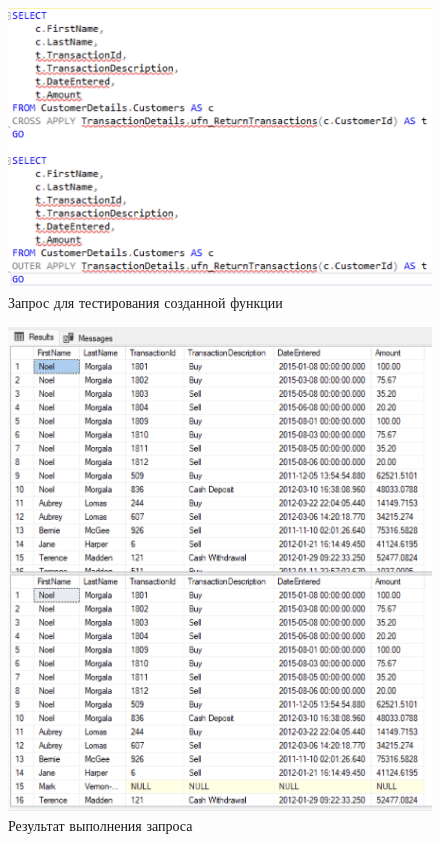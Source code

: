\documentclass[a4paper, 14pt]{extarticle}
\begin{document}
\begin{figure}[H]
  \centering
  \includegraphics[width=\textwidth]{images/task-4/3.png}
  \caption{Запрос для тестирования созданной функции}
  \label{fig:task-4-3}
\end{figure}

\begin{figure}[H]
  \centering
  \includegraphics[width=\textwidth]{images/task-4/4.png}
  \caption{Результат выполнения запроса}
  \label{fig:task-4-4}
\end{figure}
\end{document}
